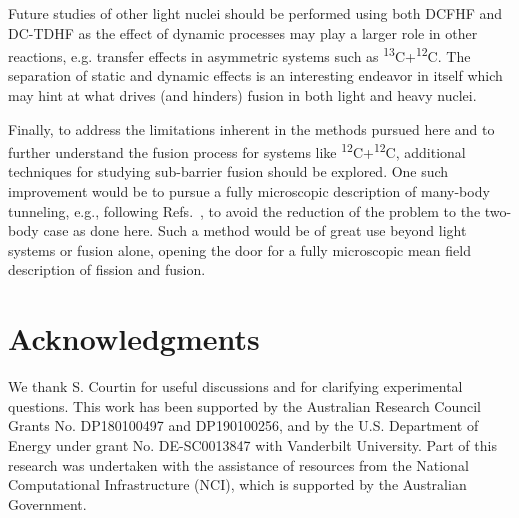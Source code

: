 Future studies of other light nuclei should be performed using both DCFHF and DC-TDHF as the effect of dynamic processes may play a larger role in other reactions, e.g. transfer effects in asymmetric systems such as \textsuperscript{13}C+\textsuperscript{12}C. 
The separation of static and dynamic effects is an interesting endeavor in itself which may hint at what drives (and hinders) fusion in both light and heavy nuclei.

Finally, to address the limitations inherent in the methods pursued here and to further understand the fusion process for systems like \textsuperscript{12}C+\textsuperscript{12}C, additional techniques for studying sub-barrier fusion should be explored.
One such improvement would be to pursue a fully microscopic description of many-body tunneling, e.g., following Refs.~\protect\citep{levit1980c,reinhardt1980}, 
to avoid the reduction of the problem to the two-body case as done here.
Such a method would be of great use beyond light systems or fusion alone, opening the door for a fully microscopic mean field description of fission and fusion.



\section*{Acknowledgments}
We thank S. Courtin for useful discussions and for clarifying experimental questions. 
This work has been supported by the
Australian Research Council Grants No. DP180100497 and DP190100256,
and by the U.S. Department of Energy under grant No.
DE-SC0013847 with Vanderbilt University.
Part of this research was undertaken with the assistance of resources
from the National Computational Infrastructure (NCI), which is supported by the Australian Government.

\clearpage

